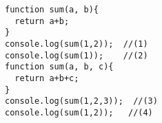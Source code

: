 \begin{Verbatim}[]
function sum(a, b){
  return a+b;
}
console.log(sum(1,2));  //(1)
console.log(sum(1));    //(2)
function sum(a, b, c){
  return a+b+c;
}
console.log(sum(1,2,3));  //(3)
console.log(sum(1,2));   //(4)
\end{Verbatim}
